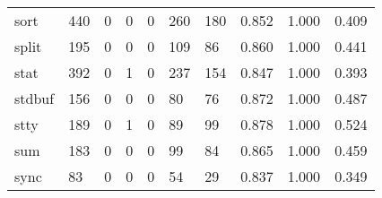 \begin{longtable}{lp{1.3cm}p{1.3cm}p{1.3cm}p{1.3cm}p{1.3cm}p{1.3cm}p{1.3cm}p{1.3cm}p{1.3cm}}
sort      &                    440 &                                             0 &                                            0 &                                           0 &                                          260 &                                        180 &                                0.852 &                                  1.000 &                                0.409 \\
split     &                    195 &                                             0 &                                            0 &                                           0 &                                          109 &                                         86 &                                0.860 &                                  1.000 &                                0.441 \\
stat      &                    392 &                                             0 &                                            1 &                                           0 &                                          237 &                                        154 &                                0.847 &                                  1.000 &                                0.393 \\
stdbuf    &                    156 &                                             0 &                                            0 &                                           0 &                                           80 &                                         76 &                                0.872 &                                  1.000 &                                0.487 \\
stty      &                    189 &                                             0 &                                            1 &                                           0 &                                           89 &                                         99 &                                0.878 &                                  1.000 &                                0.524 \\
sum       &                    183 &                                             0 &                                            0 &                                           0 &                                           99 &                                         84 &                                0.865 &                                  1.000 &                                0.459 \\
sync      &                     83 &                                             0 &                                            0 &                                           0 &                                           54 &                                         29 &                                0.837 &                                  1.000 &                                0.349 \\

\end{longtable}
